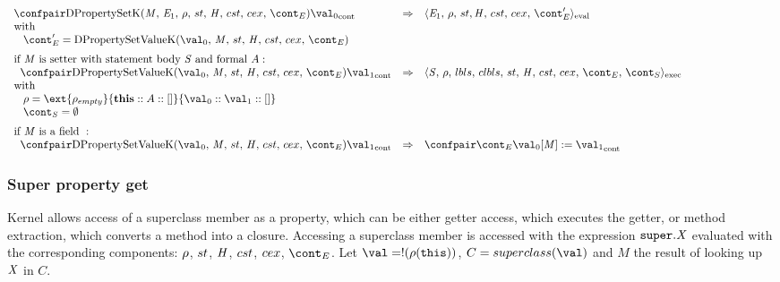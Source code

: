 \documentclass{article}
\begin{document}
\[
  \begin{array}{lcl@{\hspace{30mm}}}
	\cesktrans{
		\contconf{\DirectPropertySetK}{\val_0}}{
		\evalconf{\expressionmeta_1}{\env}{\strace}{\cstrace}{\cex}{\econt'}}\\
	\textrm{with}\\
	\hspace{3mm}
	\econt' = \DPropertySetVK\\[2mm]

	\textrm{if }\membermeta \textrm{ is setter with statement body }\stmt \textrm{ and formal }\formal :\\
	\hspace{2mm}
	\cesktrans{
		\contconf{\DPropertySetVK}{\val_1}}{
		\execconf{\stmt}{\env}{\lbls}{\clbls}{\handler}{\cstrace}{\cex}{\econt}{\scont}}\\
	\textrm{with}\\
	\hspace{3mm}
	\env = \ext{\env_{empty}}{\mathbf{this} :: \formal :: []}{\val_0 :: \val_1 :: []}\\
	\hspace{3mm}
	\scont = \emptyset\\[2mm]

	\textrm{if }\membermeta \textrm{ is a field } :\\
	\hspace{2mm}
	\cesktrans{
		\contconf{\DPropertySetVK}{\val_1}}{
		\contconf{\econt}{\update{\val_0[\membermeta]}{\val_1}}}
  \end{array}
\]

\subsubsection{Super property get}
\label{subsubsec:super-property-get}
Kernel allows access of a superclass member as a property, which can be either getter access, which executes the getter, or method extraction, which converts a method into a closure.
\noindent
Accessing a superclass member is accessed with the expression $\tt{super}.\mathit{X}$ evaluated with the corresponding components: $\rho$, $st$, $\mathit{H}$, $cst$, $cex$, $\econt$. Let $\val = \deref{(\env(\this))}$, $C = \superclass{\val}$ and $M$ the result of looking up $\mathit{X}$ in $C$.\\
\end{document}
